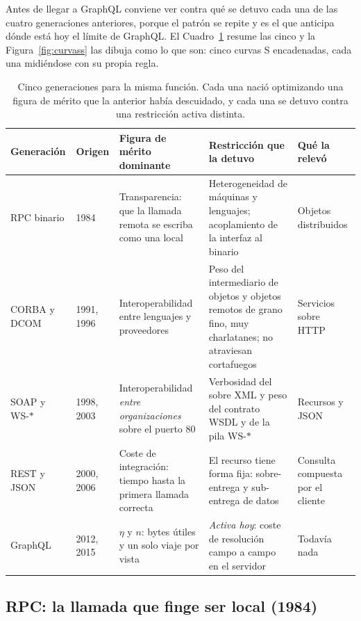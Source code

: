 \documentclass[11pt,letterpaper]{article}
\begin{document}
Antes de llegar a GraphQL conviene ver contra qué se detuvo cada una de las
cuatro generaciones anteriores, porque el patrón se repite y es el que anticipa
dónde está hoy el límite de GraphQL. El Cuadro~\ref{cuadro:generaciones} resume
las cinco y la Figura~\ref{fig:curvass} las dibuja como lo que son: cinco
curvas S encadenadas, cada una midiéndose con su propia regla.

\begin{table}[t]
\small
\caption{Cinco generaciones para la misma función. Cada una nació optimizando
una figura de mérito que la anterior había descuidado, y cada una se detuvo
contra una restricción activa distinta.}
\label{cuadro:generaciones}
\begin{tabularx}{\textwidth}{@{}p{2.55cm}p{1.5cm}p{3.5cm}XX@{}}
\toprule
\textbf{Generación} & \textbf{Origen} & \textbf{Figura de mérito dominante} &
\textbf{Restricción que la detuvo} & \textbf{Qué la relevó} \\
\midrule
RPC binario
& 1984
& Transparencia: que la llamada remota se escriba como una local
& Heterogeneidad de máquinas y lenguajes; acoplamiento de la interfaz al
  binario
& Objetos distribuidos \\
\addlinespace[2pt]
CORBA y DCOM
& 1991, 1996
& Interoperabilidad entre lenguajes y proveedores
& Peso del intermediario de objetos y objetos remotos de grano fino, muy
  charlatanes; no atraviesan cortafuegos
& Servicios sobre HTTP \\
\addlinespace[2pt]
SOAP y WS-\hspace{0pt}$\ast$
& 1998, 2003
& Interoperabilidad \emph{entre organizaciones} sobre el puerto 80
& Verbosidad del sobre XML y peso del contrato WSDL y de la pila WS-$\ast$
& Recursos y JSON \\
\addlinespace[2pt]
REST y JSON
& 2000, 2006
& Coste de integración: tiempo hasta la primera llamada correcta
& El recurso tiene forma fija: sobre-entrega y sub-entrega de datos
& Consulta compuesta por el cliente \\
\addlinespace[2pt]
GraphQL
& 2012, 2015
& $\eta$ y $n$: bytes útiles y un solo viaje por vista
& \emph{Activa hoy}: coste de resolución campo a campo en el servidor
& Todavía nada \\
\bottomrule
\end{tabularx}
\end{table}

\subsection*{RPC: la llamada que finge ser local (1984)}
\end{document}
